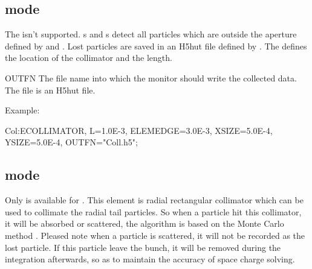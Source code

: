 \subsection{\opalt mode}
 The  isn't supported. s and s detect all particles which are outside the aperture defined by
 and . Lost particles are saved in an H5hut file defined by . The  defines the location of the collimator and  the length.
\begin{kdescription}
\item[OUTFN]
  The file name into which the monitor should write the collected data. The file is an H5hut file.
\end{kdescription}

\noindent Example:
\begin{example}
Col:ECOLLIMATOR, L=1.0E-3, ELEMEDGE=3.0E-3, XSIZE=5.0E-4,
    YSIZE=5.0E-4, OUTFN="Coll.h5";
\end{example}


\subsection{\opalcycl mode}

Only  is available for \opalcycl.  This element is radial rectangular collimator which can be used to collimate the radial tail particles.
So when a particle hit this collimator, it will be absorbed or scattered, the algorithm is based on the Monte Carlo method .
Pleased note when a particle is scattered, it will not be recorded as the lost particle.
If this particle leave the bunch, it will be removed during the integration afterwards, so as to maintain the accuracy of space charge solving.

